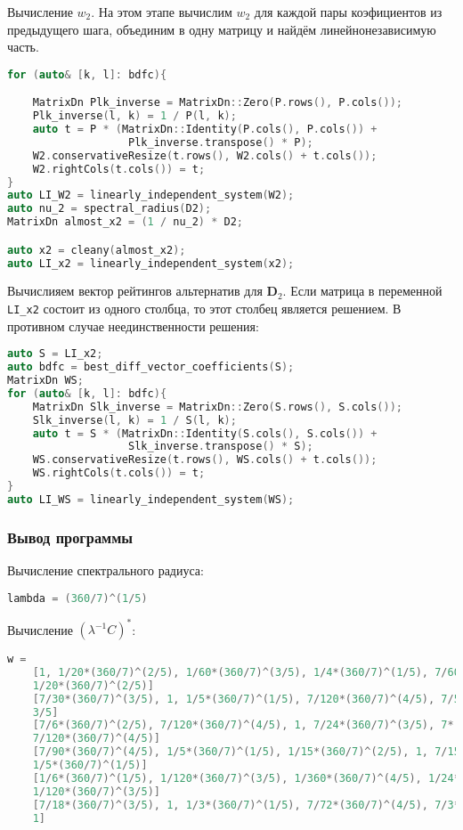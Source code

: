 \documentclass[specialist,
	substylefile = spbu_report.rtx,
	subf,href,colorlinks=true, 12pt]{disser}
\begin{document}
Вычисление $w_2$. На этом этапе вычислим $w_{2}$ для каждой пары коэфициентов из предыдущего шага, объединим в одну матрицу и найдём линейнонезависимую часть.
\begin{lstlisting}[language=c++,basicstyle=\footnotesize\ttfamily]
for (auto& [k, l]: bdfc){

    MatrixDn Plk_inverse = MatrixDn::Zero(P.rows(), P.cols());
    Plk_inverse(l, k) = 1 / P(l, k);
    auto t = P * (MatrixDn::Identity(P.cols(), P.cols()) +
                   Plk_inverse.transpose() * P);
    W2.conservativeResize(t.rows(), W2.cols() + t.cols());
    W2.rightCols(t.cols()) = t;
}
auto LI_W2 = linearly_independent_system(W2);
auto nu_2 = spectral_radius(D2);
MatrixDn almost_x2 = (1 / nu_2) * D2;

auto x2 = cleany(almost_x2);
auto LI_x2 = linearly_independent_system(x2);
\end{lstlisting}

Вычислияем вектор рейтингов альтернатив для $\mathbf{D}_2$.
Если матрица в переменной \texttt{LI\_x2} состоит из одного столбца, то этот столбец является решением. В противном случае неединственности решения:

\begin{lstlisting}[language=c++,basicstyle=\footnotesize\ttfamily]
auto S = LI_x2;
auto bdfc = best_diff_vector_coefficients(S);
MatrixDn WS;
for (auto& [k, l]: bdfc){
    MatrixDn Slk_inverse = MatrixDn::Zero(S.rows(), S.cols());
    Slk_inverse(l, k) = 1 / S(l, k);
    auto t = S * (MatrixDn::Identity(S.cols(), S.cols()) +
                   Slk_inverse.transpose() * S);
    WS.conservativeResize(t.rows(), WS.cols() + t.cols());
    WS.rightCols(t.cols()) = t;
}
auto LI_WS = linearly_independent_system(WS);
\end{lstlisting}

\subsubsection{Вывод программы}

Вычисление  спектрального радиуса:
\begin{lstlisting}[language=c++,basicstyle=\footnotesize\ttfamily]
	lambda = (360/7)^(1/5)
\end{lstlisting}

Вычисление $(\lambda^{-1}C)^*$:
\begin{lstlisting}[language=c++,basicstyle=\scriptsize\ttfamily]
	w = 
	[1, 1/20*(360/7)^(2/5), 1/60*(360/7)^(3/5), 1/4*(360/7)^(1/5), 7/60*(360/7)^(4/5), 
	1/20*(360/7)^(2/5)]
	[7/30*(360/7)^(3/5), 1, 1/5*(360/7)^(1/5), 7/120*(360/7)^(4/5), 7/5*(360/7)^(2/5), 
	3/5]
	[7/6*(360/7)^(2/5), 7/120*(360/7)^(4/5), 1, 7/24*(360/7)^(3/5), 7*(360/7)^(1/5), 
	7/120*(360/7)^(4/5)]
	[7/90*(360/7)^(4/5), 1/5*(360/7)^(1/5), 1/15*(360/7)^(2/5), 1, 7/15*(360/7)^(3/5), 
	1/5*(360/7)^(1/5)]
	[1/6*(360/7)^(1/5), 1/120*(360/7)^(3/5), 1/360*(360/7)^(4/5), 1/24*(360/7)^(2/5), 1, 
	1/120*(360/7)^(3/5)]
	[7/18*(360/7)^(3/5), 1, 1/3*(360/7)^(1/5), 7/72*(360/7)^(4/5), 7/3*(360/7)^(2/5), 
	1]
\end{lstlisting}
\end{document}
